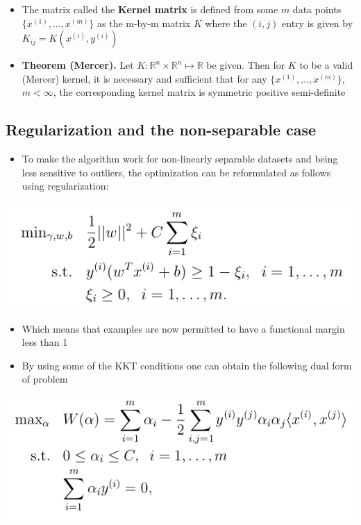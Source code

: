 \documentclass[11pt]{article}
\begin{document}
\begin{itemize}
\item The matrix called the \textbf{Kernel matrix} is defined from some \(m\) data points \(\{x^{(1)}, \dots, x^{(m)}\}\) as the m-by-m matrix \(K\) where the \((i,j)\) entry is given by \(K_{ij}=K(x^{(i)},y^{(i)})\)

\item \textbf{Theorem (Mercer).} Let \(K: \mathbb R^n \times \mathbb R^n \mapsto \mathbb R\) be given. Then for \(K\) to be a valid (Mercer) kernel, it is necessary and sufficient that for any \(\{x^{(1)}, \dots, x^{(m)}\}\), \(m < \infty\), the corresponding kernel matrix is symmetric positive semi-definite
\end{itemize}

\subsection{Regularization and the non-separable case}
\label{sec:orgb6d8784}
\begin{itemize}
\item To make the algorithm work for non-linearly separable datasets and being less sensitive to outliers, the optimization can be reformulated as follows using regularization:
\end{itemize}
\begin{center}
\includegraphics[width=.9\linewidth]{Support Vector Machines/screenshot_2018-09-25_08-30-17.png}
\end{center}
\begin{itemize}
\item Which means that examples are now permitted to have a functional margin less than 1

\item By using some of the KKT conditions one can obtain the following dual form of problem
\end{itemize}
\begin{center}
\includegraphics[width=.9\linewidth]{Support Vector Machines/screenshot_2018-09-25_08-36-39.png}
\end{center}
\end{document}
